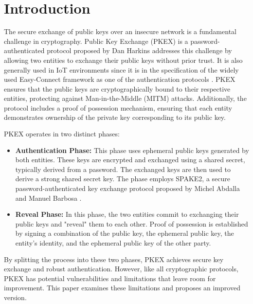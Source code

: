 \section{Introduction}

The secure exchange of public keys over an insecure network is a fundamental
challenge in cryptography. Public Key Exchange (PKEX) is a
password-authenticated protocol proposed by Dan Harkins \cite{harkins-pkex-06}
addresses this challenge by allowing two entities to exchange their public
keys without prior trust. It is also generally used in IoT environments since it
is in the specification of the widely used Easy-Connect framework as one of the
authentication protocols \cite{wifi_easy_connect}. PKEX ensures that the public
keys are cryptographically bound to their respective entities, protecting
against Man-in-the-Middle (MITM) attacks. Additionally, the protocol
includes a proof of possession mechanism, ensuring that each entity
demonstrates ownership of the private key corresponding to its public key.

PKEX operates in two distinct phases:
\begin{itemize}
	\item \textbf{Authentication Phase:} This phase uses ephemeral public keys
		generated by both entities. These keys are encrypted and exchanged
		using a shared secret, typically derived from a password. The exchanged
		keys are then used to derive a strong shared secret key. The phase
		employs SPAKE2, a secure password-authenticated key exchange protocol
		proposed by Michel Abdalla and Manuel Barbosa \cite{Abdalla2005}.
	\item \textbf{Reveal Phase:} In this phase, the two entities commit to
		exchanging their public keys and "reveal" them to each other. Proof of
		possession is established by signing a combination of the public key,
		the ephemeral public key, the entity's identity, and the ephemeral
		public key of the other party.
\end{itemize}

By splitting the process into these two phases, PKEX achieves secure key
exchange and robust authentication. However, like all cryptographic protocols,
PKEX has potential vulnerabilities and limitations that leave room for
improvement. This paper examines these limitations and proposes an improved
version.
